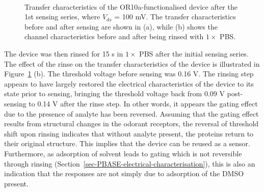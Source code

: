\documentclass[
  a4paper,
]{scrbook}
\begin{document}
\begin{figure}
\begin{minipage}[t]{0.46\linewidth}
{{}

}

\end{minipage}%
%
\begin{minipage}[t]{0.01\linewidth}

{\centering 

~

}

\end{minipage}%

\caption[Transfer characteristics of the OR10a-functionalised device
after the 1st sensing series.]{\label{fig-OR10a-TX-1}Transfer
characteristics of the OR10a-functionalised device after the 1st sensing
series, where \(V_{ds}\) = 100 mV. The transfer characteristics before
and after sensing are shown in (a), while (b) shows the channel
characteristics before and after being rinsed with \(1 \times\) PBS.}

\end{figure}

The device was then rinsed for 15 s in \(1 \times\) PBS after the
initial sensing series. The effect of the rinse on the transfer
characteristics of the device is illustrated in
Figure~\ref{fig-OR10a-TX-1} (b). The threshold voltage before sensing
was 0.16 V. The rinsing step appears to have largely restored the
electrical characteristics of the device to its state prior to sensing,
bringing the threshold voltage back from 0.09 V post-sensing to 0.14 V
after the rinse step. In other words, it appears the gating effect due
to the presence of analyte has been reversed. Assuming that the gating
effect results from structural changes in the odorant receptors, the
reversal of threshold shift upon rinsing indicates that without analyte
present, the proteins return to their original structure. This implies
that the device can be reused as a sensor. Furthermore, as adsorption of
solvent leads to gating which is not reversible through rinsing
(Section~\ref{sec-PBASE-electrical-characterisation}), this is also an
indication that the responses are not simply due to adsorption of the
DMSO present.
\end{document}
